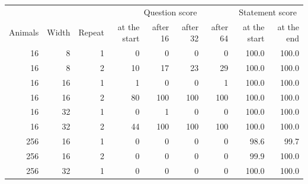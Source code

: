 \begin{tabular}{@{}rrrrrrrrr@{}}
\toprule
 & & & \multicolumn{4}{c}{Question score} & \multicolumn{2}{c}{Statement score} \\
Animals & Width & Repeat & at the start & after 16 & after 32 & after 64 & at the start & at the end \\
\midrule
16 & 8 & 1 & 0 & 0 & 0 & 0 & 100.0 & 100.0 \\
16 & 8 & 2 & 10 & 17 & 23 & 29 & 100.0 & 100.0 \\
16 & 16 & 1 & 1 & 0 & 0 & 1 & 100.0 & 100.0 \\
16 & 16 & 2 & 80 & 100 & 100 & 100 & 100.0 & 100.0 \\
16 & 32 & 1 & 0 & 1 & 0 & 0 & 100.0 & 100.0 \\
16 & 32 & 2 & 44 & 100 & 100 & 100 & 100.0 & 100.0 \\
256 & 16 & 1 & 0 & 0 & 0 & 0 & 98.6 & 99.7 \\
256 & 16 & 2 & 0 & 0 & 0 & 0 & 99.9 & 100.0 \\
256 & 32 & 1 & 0 & 0 & 0 & 0 & 100.0 & 100.0 \\
\bottomrule
\end{tabular}
